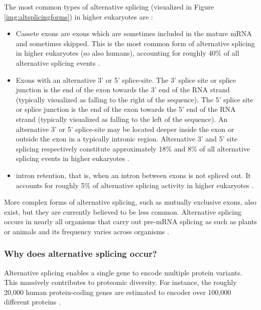 The most common types of alternative splicing (visualized in Figure \ref{img:altsplicingforms}) in higher eukaryotes are \cite{commonsplicing1}\cite{commonsplicing2}:
\begin{itemize}
	\item Cassete exons are exons which are sometimes included in the mature mRNA and sometimes skipped. This is the most common form of alternative splicing in higher eukaryotes (so also humans), accounting for roughly 40\% of all alternative splicing events \cite{splicing_current_perspectives}.
	\item Exons with an alternative 3' or 5' splice-site. The 3' splice site or splice junction is the end of the exon towards the 3' end of the RNA strand (typically visualized as falling to the right of the sequence). The 5' splice site or splice junction is the end of the exon towards the 5' end of the RNA strand (typically visualized as falling to the left of the sequence). An alternative 3' or 5' splice-site may be located deeper inside the exon or outside the exon in a typically intronic region. Alternative 3' and 5' site splicing respectively constitute approximately 18\% and 8\% of all alternative splicing events in higher eukaryotes \cite{splicing_current_perspectives}. 
	\item intron retention, that is, when an intron between exons is not spliced out. It accounts for roughly 5\% of alternative splicing activity in higher eukaryotes \cite{splicing_current_perspectives}.
\end{itemize}



More complex forms of alternative splicing, such as mutually exclusive exons, also exist, but they are currently believed to be less common. Alternative splicing occurs in nearly all organisms that carry out pre-mRNA splicing as such as plants or animals and its frequency varies across organisms \cite{splicing_current_perspectives}. 
\subsubsection{Why does alternative splicing occur?}
Alternative splicing enables a single gene to encode multiple protein variants. This massively contributes to proteomic diversity. For instance, the roughly 20,000 human protein-coding genes are estimated to encoder over 100,000 different proteins \cite{splicing_current_perspectives}.

